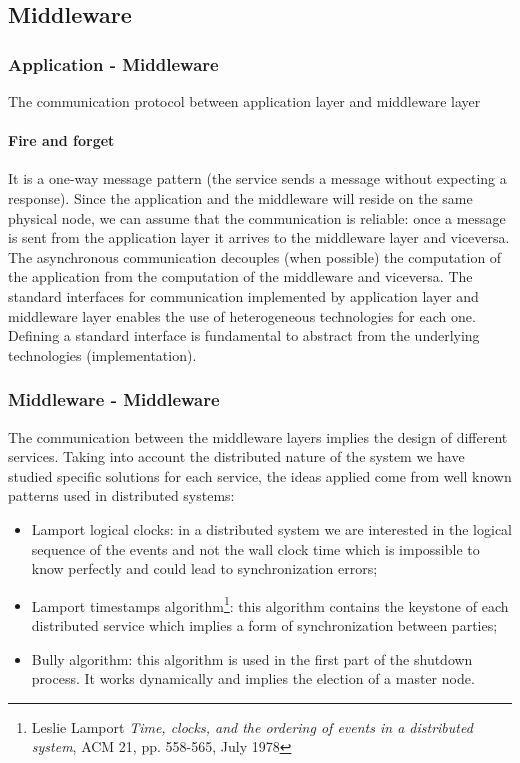 \subsection{Middleware}
\subsubsection{Application - Middleware}
The communication protocol between application layer and middleware layer
\paragraph{Fire and forget}
It is a one-way message pattern (the service sends a message without expecting
a response). Since the application and the middleware will reside on the same
physical node, we can assume that the communication is reliable: once a message
is sent from the application layer it arrives to the middleware layer and
viceversa. The asynchronous communication decouples (when possible)
the computation of the application from the computation of the middleware
and viceversa. The standard interfaces for communication
implemented by application layer and middleware layer enables the use of
heterogeneous technologies for each one. Defining a standard interface
is fundamental to abstract from the underlying technologies (implementation).

\subsubsection{Middleware - Middleware}

The communication between the middleware layers implies the design of different
services. Taking into account the distributed nature of the system we have
studied specific solutions for each service, the ideas applied come from
well known patterns used in distributed systems:
\begin{itemize}
\item Lamport logical clocks: in a distributed system we are interested
  in the logical sequence of the events and not the wall clock time which is
  impossible to know perfectly and could lead to synchronization errors;
\item Lamport timestamps algorithm\footnote{Leslie Lamport \textit{Time,
  clocks, and the ordering of events in a distributed system}, ACM 21,
  pp. 558-565, July 1978}: this algorithm contains the keystone
  of each distributed service which implies a form of synchronization
  between parties;
\item Bully algorithm: this algorithm is used in the first part of the
  shutdown process. It works dynamically and implies the election of a master
  node.
\end{itemize}

